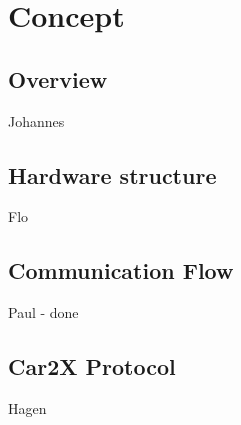 \chapter{Concept}

\section{Overview}
Johannes

\section{Hardware structure}
Flo

\section{Communication Flow}
Paul - done

\section{Car2X Protocol}
Hagen
